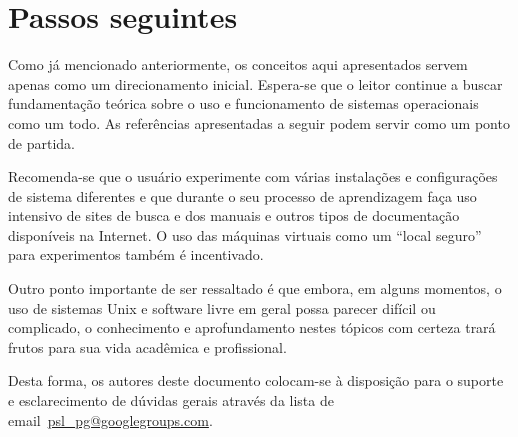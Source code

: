 \documentclass{handout_utfpr}
\begin{document}
\section{Passos seguintes}
Como já mencionado anteriormente, os conceitos aqui apresentados servem apenas como um direcionamento inicial. Espera-se que o leitor continue a buscar fundamentação teórica sobre o uso e funcionamento de sistemas operacionais como um todo. As referências apresentadas a seguir podem servir como um ponto de partida.

Recomenda-se que o usuário experimente com várias instalações e configurações de sistema diferentes e que durante o seu processo de aprendizagem faça uso intensivo de sites de busca e dos manuais e outros tipos de documentação disponíveis na Internet. O uso das máquinas virtuais como um ``local seguro'' para experimentos também é incentivado.

Outro ponto importante de ser ressaltado é que embora, em alguns momentos, o uso de sistemas Unix e software livre em geral possa parecer difícil ou complicado, o conhecimento e aprofundamento nestes tópicos com certeza trará frutos para sua vida acadêmica e profissional.

Desta forma, os autores deste documento colocam-se à disposição para o suporte e esclarecimento de dúvidas gerais através da lista de email~\url{psl_pg@googlegroups.com}.

\nocite{Tanenbaum:2007:MOS:1410217}
\nocite{shotts2012linux}
\nocite{anatomy2007}
\nocite{gnu.org}
\nocite{learn2012}
\nocite{linux2013}


\end{document}
